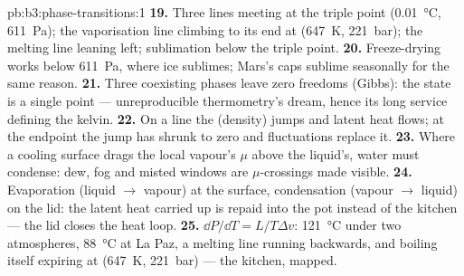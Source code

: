 \begin{solution}{pb:b3:phase-transitions:1}
\textbf{19.} Three lines meeting at the triple point
(\qty{0.01}{\celsius}, \qty{611}{Pa}); the vaporisation line
climbing to its end at (\qty{647}{K}, \qty{221}{bar}); the
melting line leaning left; sublimation below the triple point.
\textbf{20.} Freeze-drying works below \qty{611}{Pa}, where ice
sublimes; Mars's caps sublime seasonally for the same reason.
\textbf{21.} Three coexisting phases leave zero freedoms (Gibbs):
the state is a single point --- unreproducible thermometry's
dream, hence its long service defining the kelvin.
\textbf{22.} On a line the  (density) jumps and
latent heat flows; at the endpoint the jump has shrunk to zero
and fluctuations replace it.
\textbf{23.} Where a cooling surface drags the local vapour's
$\mu$ above the liquid's, water must condense: dew, fog and
misted windows are $\mu$-crossings made visible.
\textbf{24.} Evaporation (liquid $\to$ vapour) at the surface,
condensation (vapour $\to$ liquid) on the lid: the latent heat
carried up is repaid into the pot instead of the kitchen --- the
lid closes the heat loop.
\textbf{25.} $\dd P/\dd T = L/T\Delta v$: \qty{121}{\celsius}
under two atmospheres, \qty{88}{\celsius} at La Paz, a melting
line running backwards, and boiling itself expiring at
(\qty{647}{K}, \qty{221}{bar}) --- the kitchen, mapped.
\end{solution}
